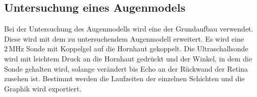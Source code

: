 \subsection{Untersuchung eines Augenmodels}

\begin{flushleft}
    Bei der Untersuchung des Augenmodells  wird eine der Grundaufbau verwendet.
    Diese wird mit dem zu untersuchendem Augenmodell erweitert.
    Es wird eine $2\,\unit{\mega\hertz}$ Sonde mit Koppelgel auf die Hornhaut gekoppelt.
    Die Ultraschallsonde wird mit leichtem Druck an die Hornhaut gedrückt und der Winkel, in dem die Sonde gehalten wird, solange verändert bis Echo an der Rückwand  der Retina zusehen ist.
    Bestimmt werden die Laufzeiten der einzelnen Schichten und die Graphik wird exportiert.
\end{flushleft}